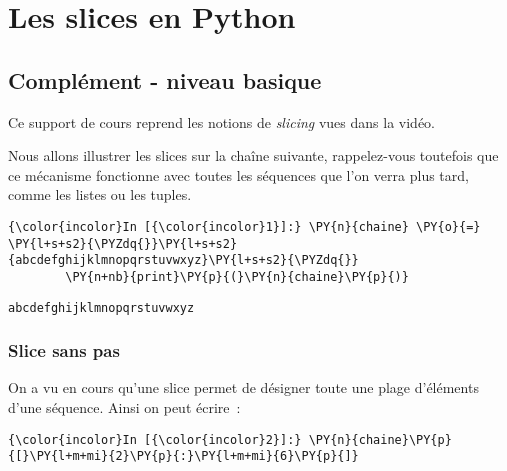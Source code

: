     
    
    
    

    

    \hypertarget{les-slices-en-python}{%
\section{Les slices en Python}\label{les-slices-en-python}}

    \hypertarget{compluxe9ment---niveau-basique}{%
\subsection{Complément - niveau
basique}\label{compluxe9ment---niveau-basique}}

    Ce support de cours reprend les notions de \emph{slicing} vues dans la
vidéo.

    Nous allons illustrer les slices sur la chaîne suivante, rappelez-vous
toutefois que ce mécanisme fonctionne avec toutes les séquences que l'on
verra plus tard, comme les listes ou les tuples.

    \begin{Verbatim}[commandchars=\\\{\}]
{\color{incolor}In [{\color{incolor}1}]:} \PY{n}{chaine} \PY{o}{=} \PY{l+s+s2}{\PYZdq{}}\PY{l+s+s2}{abcdefghijklmnopqrstuvwxyz}\PY{l+s+s2}{\PYZdq{}}
        \PY{n+nb}{print}\PY{p}{(}\PY{n}{chaine}\PY{p}{)}
\end{Verbatim}


    \begin{Verbatim}[commandchars=\\\{\}]
abcdefghijklmnopqrstuvwxyz

    \end{Verbatim}

    \hypertarget{slice-sans-pas}{%
\subsubsection{Slice sans pas}\label{slice-sans-pas}}

    On a vu en cours qu'une slice permet de désigner toute une plage
d'éléments d'une séquence. Ainsi on peut écrire~:

    \begin{Verbatim}[commandchars=\\\{\}]
{\color{incolor}In [{\color{incolor}2}]:} \PY{n}{chaine}\PY{p}{[}\PY{l+m+mi}{2}\PY{p}{:}\PY{l+m+mi}{6}\PY{p}{]}
\end{Verbatim}



